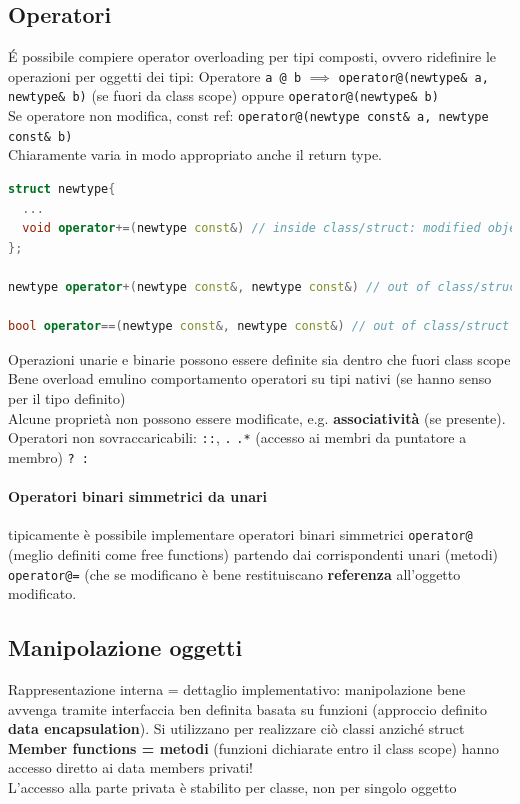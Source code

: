 \documentclass[10pt, oneside]{book}
\begin{document}
\subsection{Operatori}
\'E possibile compiere operator overloading per tipi composti, ovvero ridefinire le operazioni per oggetti dei tipi:
Operatore \texttt{a @ b} $\implies$ \texttt{operator@(newtype\& a, newtype\& b)} (se fuori da class scope) oppure \texttt{operator@(newtype\& b)}\\
Se operatore non modifica, const ref: \texttt{operator@(newtype const\& a, newtype const\& b)}\\
Chiaramente varia in modo appropriato anche il return type.
\begin{lstlisting}[language=C++]
struct newtype{
  ...
  void operator+=(newtype const&) // inside class/struct: modified object implicit
};

newtype operator+(newtype const&, newtype const&) // out of class/struct

bool operator==(newtype const&, newtype const&) // out of class/struct

\end{lstlisting}
Operazioni unarie e binarie possono essere definite sia dentro che fuori class scope\\
Bene overload emulino comportamento operatori su tipi nativi (se hanno senso per il tipo definito)\\
Alcune proprietà non possono essere modificate, e.g. \textbf{associatività} (se presente).\\
Operatori non sovraccaricabili: \texttt{::}, \texttt{.} \texttt{.*} (accesso ai membri da puntatore a membro) \texttt{? :}

\paragraph{Operatori binari simmetrici da unari} tipicamente è possibile implementare operatori binari simmetrici \texttt{operator@} (meglio definiti come free functions) partendo dai corrispondenti unari (metodi) \texttt{operator@=} (che se modificano è bene restituiscano \textbf{referenza} all'oggetto modificato.

\subsection{Manipolazione oggetti}
Rappresentazione interna = dettaglio implementativo: manipolazione bene avvenga tramite interfaccia ben definita basata su funzioni (approccio definito \textbf{data encapsulation}). Si utilizzano per realizzare ciò classi anziché struct\\
\textbf{Member functions = metodi} (funzioni dichiarate entro il class scope) hanno accesso diretto ai data members privati!\\
L'accesso alla parte privata è stabilito per classe, non per singolo oggetto
\end{document}
